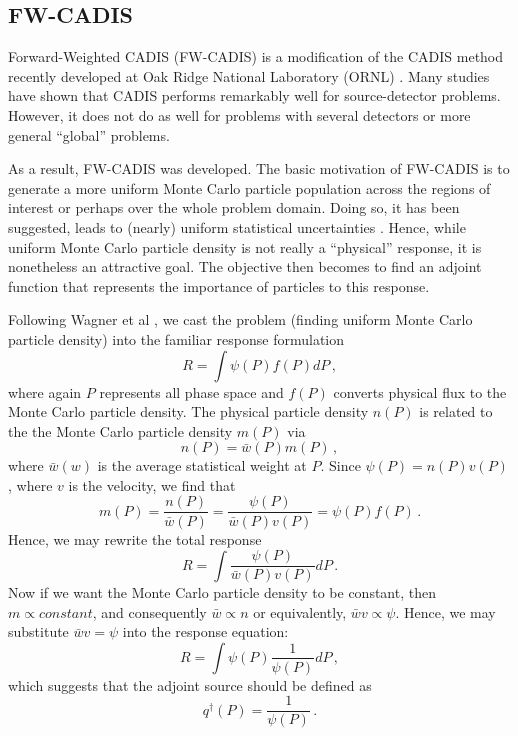 \subsection{FW-CADIS}

Forward-Weighted CADIS (FW-CADIS) is a modification of the CADIS method recently
developed at Oak Ridge National Laboratory (ORNL)
\cite{peplow2009sot,wagner2009fwc}.  Many studies have shown that CADIS performs
remarkably well for source-detector problems.  However, it does not do as well
for problems with several detectors or more general ``global'' problems.

As a result, FW-CADIS was developed.  The basic motivation of FW-CADIS is to
generate a more uniform Monte Carlo particle population across the regions of
interest or perhaps over the whole problem domain.  Doing so, it has been
suggested, leads to (nearly) uniform statistical uncertainties
\cite{cooper2001aww}.  Hence, while uniform Monte Carlo particle density is not
really a ``physical'' response, it is nonetheless an attractive goal.  The
objective then becomes to find an adjoint function that represents the
importance of particles to this response.

Following Wagner et al \cite{wagner2009fwc}, we cast the problem (\ie finding
uniform Monte Carlo particle density) into the familiar response formulation
\begin{equation}
 R = \int \psi(P) f(P) dP \, ,
\end{equation}
where again $P$ represents all phase space and $f(P)$ converts physical flux to
the Monte Carlo particle density.  The physical particle density $n(P)$ is
related to the the Monte Carlo particle density $m(P)$ via
\begin{equation}
 n(P) = \bar{w}(P)m(P) \, ,
\end{equation}
where $\bar{w}(w)$ is the average statistical weight at $P$. Since $\psi(P) =
n(P)v(P)$, where $v$ is the velocity, we find that
\begin{equation}
 m(P) = \frac{n(P)}{\bar{w}(P)} = \frac{\psi(P)}{\bar{w}(P)v(P)} = \psi(P) f(P)
\, .
\end{equation}
Hence, we may rewrite the total response
\begin{equation}
 R = \int \frac{\psi(P)}{\bar{w}(P)v(P)} dP \, .
\end{equation}
Now if we want the Monte Carlo particle density to be constant,  then $m\propto
constant$, and consequently $\bar{w} \propto n$ or equivalently, $\bar{w} v
\propto \psi$.  Hence, we may substitute $\bar{w} v = \psi$ into the response
equation:
\begin{equation}
 R = \int \psi(P) \frac{1}{\psi(P)} dP \, ,
\end{equation}
which suggests that the adjoint source should be defined as
\begin{equation}
 q^\dag(P) = \frac{1}{\psi(P)} \, .
\end{equation}

